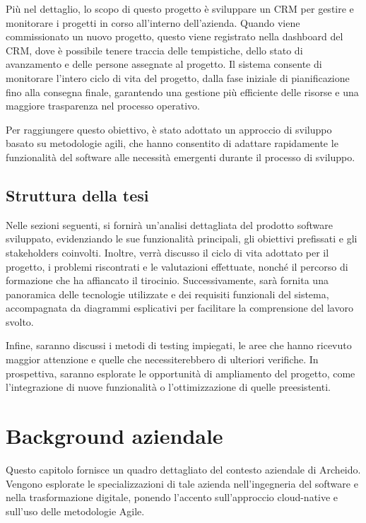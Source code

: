 \documentclass[target=bach,aauheader=,style=]{thud}
\begin{document}
\noindent  Più nel dettaglio, lo scopo di questo progetto è sviluppare un CRM per gestire e monitorare i progetti in corso all'interno dell'azienda. Quando viene commissionato un nuovo progetto, questo viene registrato nella dashboard del CRM, dove è possibile tenere traccia delle tempistiche, dello stato di avanzamento e delle persone assegnate al progetto. Il sistema consente di monitorare l'intero ciclo di vita del progetto, dalla fase iniziale di pianificazione fino alla consegna finale, garantendo una gestione più efficiente delle risorse e una maggiore trasparenza nel processo operativo.

\noindent Per raggiungere questo obiettivo, è stato adottato un approccio di sviluppo basato su metodologie agili, che hanno consentito di adattare rapidamente le funzionalità del software alle necessità emergenti durante il processo di sviluppo.


\section{Struttura della tesi}

Nelle sezioni seguenti, si fornirà un'analisi dettagliata del prodotto software sviluppato, evidenziando le sue funzionalità principali, gli obiettivi prefissati e gli stakeholders coinvolti. Inoltre, verrà discusso il ciclo di vita adottato per il progetto, i problemi riscontrati e le valutazioni effettuate, nonché il percorso di formazione che ha affiancato il tirocinio. Successivamente, sarà fornita una panoramica delle tecnologie utilizzate e dei requisiti funzionali del sistema, accompagnata da diagrammi esplicativi per facilitare la comprensione del lavoro svolto. 

\noindent Infine, saranno discussi i metodi di testing impiegati, le aree che hanno ricevuto maggior attenzione e quelle che necessiterebbero di ulteriori verifiche. In prospettiva, saranno esplorate le opportunità di ampliamento del progetto, come l'integrazione di nuove funzionalità o l'ottimizzazione di quelle preesistenti. 

\chapter{Background aziendale}
Questo capitolo fornisce un quadro dettagliato del contesto aziendale di Archeido. Vengono esplorate le specializzazioni di tale azienda nell'ingegneria del software e nella trasformazione digitale, ponendo l'accento sull'approccio cloud-native e sull'uso delle metodologie Agile.
\end{document}
